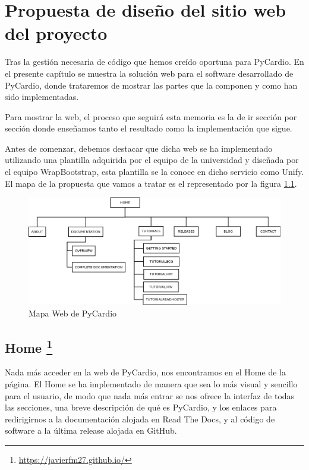 \chapter{Propuesta de diseño del sitio web del proyecto}
\label{chap:webProp}
Tras la gestión necesaria de código que hemos creído oportuna para PyCardio. En el presente capítulo se muestra la solución web para el software desarrollado de PyCardio, donde trataremos de mostrar las partes que la componen y como han sido implementadas.

Para mostrar la web, el proceso que seguirá esta memoria es la de ir sección por sección donde enseñamos tanto el resultado como la implementación que sigue.

Antes de comenzar, debemos destacar que dicha web se ha implementado utilizando una plantilla adquirida por el equipo de la universidad y diseñada por el equipo WrapBootstrap, esta plantilla se la conoce en dicho servicio como Unify. El mapa de la propuesta que vamos a tratar es el representado por la figura \ref{fig:mapaWeb}.

\begin{figure}[h!]
    \centering
    \includegraphics[width=\textwidth]{img/mapaWeb.png}
    \caption{Mapa Web de PyCardio}
    \label{fig:mapaWeb}
\end{figure}

\section[Home]{Home \footnote{\url{https://javierfm27.github.io/}}}
\label{sec:homeWeb}
Nada más acceder en la web de PyCardio, nos encontramos en el Home de la página. El Home se ha implementado de manera que sea lo más visual y sencillo para el usuario, de modo que nada más entrar se nos ofrece la interfaz de todas las secciones, una breve descripción de qué es PyCardio, y los enlaces para redirigirnos a la documentación alojada en Read The Docs, y al código de software a la última release alojada en GitHub. \\

